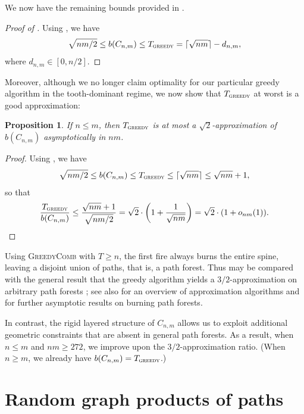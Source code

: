 \documentclass{article}
\newcommand{\gr}{\textsc{greedy}}
\newtheorem{proposition}{Proposition}
\begin{document}
We now have the remaining bounds provided in .

\begin{proof}[Proof of ]
    Using , we have
    \[
    \sqrt{nm/2} \le b(C_{n,m}) \le T_\gr = \lceil \sqrt{nm}\rceil - d_{n,m},
    \]
    where $d_{n,m} \in [0,n/2]$.
\end{proof}

Moreover, although we no longer claim optimality for our particular greedy algorithm in the tooth-dominant regime, we now show that $T_\gr$ at worst is a good approximation:

\begin{proposition}\label{prop: approx}
    If $n \le m$, then $T_{\gr}$ is at most a $\sqrt{2}$-approximation of $b(C_{n,m})$ asymptotically in $nm$. 
\end{proposition}
\begin{proof}
    Using , we have 
    \[
    \sqrt{nm/2} \le b(C_{n,m}) \le T_{\gr} \le  \lceil \sqrt{nm} \rceil \le \sqrt{nm} + 1,
    \]
    so that
    \begin{equation*}
    \frac{T_{\gr}}{b(C_{n,m})} \le \frac{\sqrt{nm} + 1}{\sqrt{nm/2}} = \sqrt 2 \cdot \left(1 + \frac1{\sqrt{nm}}\right) = \sqrt 2 \cdot (1 + o_{nm}(1)).
    \end{equation*} 
\end{proof}

Using \textsc{GreedyComb} with $T \ge n$, the first fire always burns the entire spine, leaving a disjoint union of paths, that is, a path forest. Thus  may be compared with the general result that the greedy algorithm yields a $3/2$-approximation on arbitrary path forests \cite{bonato2019bounds}; see also \cite{bonato2019approximation} for an overview of approximation algorithms and \cite{tan2020graph} for further asymptotic results on burning path forests.

In contrast, the rigid layered structure of $C_{n,m}$  allows us to exploit additional geometric constraints that are absent in general path forests. As a result, when $n \le m$ and $nm \ge 272$, we improve upon the $3/2$-approximation ratio. (When $n \ge m$, we already have $b(C_{n,m}) = T_\gr$.)

 


\appendix
\section{Random graph products of paths}\label{sec: random}
\end{document}
